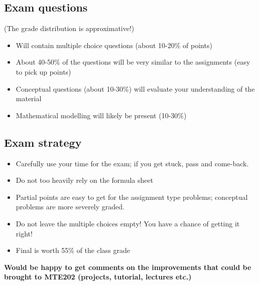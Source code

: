 \subsection*{Exam questions}
(The grade distribution is approximative!)
\begin{itemize}
\item Will contain multiple choice questions (about 10-20\% of points)
\item About 40-50\% of the questions will be very similar to the assignments (easy to pick up points)
\item Conceptual questions (about 10-30\%) will evaluate your understanding of the material
\item Mathematical modelling will likely be present (10-30\%)
\end{itemize}


\subsection*{Exam strategy}
\begin{itemize}
\item Carefully use your time for the exam; if you get stuck, pass and come-back.
\item Do not too heavily rely on the formula sheet
\item Partial points are easy to get for the assignment type problems; conceptual problems are more severely graded.
\item  Do not leave the multiple choices empty! You have a chance of getting it right!
\item Final is worth 55\% of the class grade
\end{itemize}

\textbf{Would be happy to get comments on the improvements that could be brought to MTE202 (projects, tutorial, lectures etc.)}


